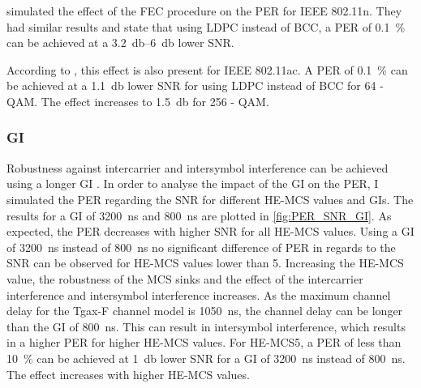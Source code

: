 \textcite{syafei_performance_2009} simulated the effect of the \ac{FEC} procedure on the \ac{PER} for IEEE 802.11n. They
had similar results and state that using \ac{LDPC} instead of \ac{BCC}, a \ac{PER} of \SI{0.1}{\percent}  can be achieved at a
\SIrange{3.2}{6}{\decibel} lower \ac{SNR}.

According to \textcite{tran_asic_2014}, this effect is also present for IEEE 802.11ac. A \ac{PER} of \SI{0.1}{\percent} can be achieved at a
\SI{1.1}{\decibel} lower \ac{SNR} for using \ac{LDPC} instead of \ac{BCC} for 64 - \ac{QAM}. The effect increases to \SI{1.5}{\decibel} for 256 - \ac{QAM}.

\subsubsection*{\acf{GI}}

Robustness against intercarrier and intersymbol interference can be achieved using a longer \ac{GI} \cite{pulimamidi_development_2007}. In order to analyse the impact of the \ac{GI} on the \ac{PER},
I simulated the \ac{PER} regarding the \ac{SNR} for different HE-MCS values and \ac{GI}s. The results for a \ac{GI} of \SI{3200}{\nano\second} and \SI{800}{\nano\second} are plotted in \autoref{fig:PER_SNR_GI}.
As expected, the \ac{PER} decreases with higher \ac{SNR} for all HE-MCS values. Using a \ac{GI} of \SI{3200}{\nano\second} instead of \SI{800}{\nano\second} no significant difference of \ac{PER} in regards to the \ac{SNR} can be observed for HE-\ac{MCS} values lower than \num{5}.
Increasing the HE-\ac{MCS} value, the robustness of the \ac{MCS} sinks and the effect of the intercarrier interference and intersymbol interference increases.
As the maximum channel delay for the Tgax-F channel model is \SI{1050}{\nano\second}, the channel delay can be longer than the \ac{GI} of \SI{800}{\nano\second}. This
can result in intersymbol interference, which results in a higher \ac{PER} for higher HE-\ac{MCS} values.
For HE-\ac{MCS}\num{5}, a \ac{PER} of less than \SI{10}{\percent} can be achieved at \SI{1}{\decibel} lower \ac{SNR} for a \ac{GI} of \SI{3200}{\nano\second} instead of \SI{800}{\nano\second}. The effect increases
with higher HE-\ac{MCS} values.

